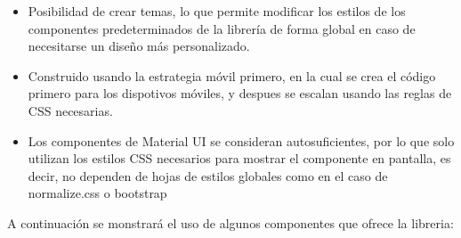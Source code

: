 \begin{itemize}
  \item Posibilidad de crear temas, lo que permite modificar los estilos de los componentes predeterminados de la librería de forma global en caso de necesitarse un diseño más personalizado.
  \item Construido usando la estrategia móvil primero, en la cual se crea el código primero para los dispotivos móviles, y despues se escalan usando las reglas de CSS necesarias.
  \item Los componentes de Material UI se consideran autosuficientes, por lo que solo utilizan los estilos CSS necesarios para mostrar el componente en pantalla, es decir, no dependen de hojas de estilos globales como en el caso de normalize.css o bootstrap
\end{itemize}

A continuación se monstrará el uso de algunos componentes que ofrece la libreria:

